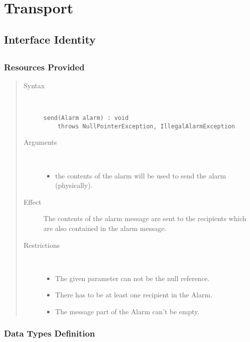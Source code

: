 \section{Transport}

\subsection{Interface Identity}

\subsection{}

\subsubsection{Resources Provided}

\begin{quote}
	\begin{description}
		\item[Syntax] \
		\begin{verbatim}
send(Alarm alarm) : void
    throws NullPointerException, IllegalAlarmException
		\end{verbatim}
		\item[Arguments] \
		\begin{itemize}
		  \item the contents of the alarm will be used to send the alarm (physically). 
		\end{itemize}
		\item[Effect] The contents of the alarm message are sent to the recipients
		which are also contained in the alarm message.
		\item[Restrictions] \
		\begin{itemize}
		  \item The given parameter can not be the null reference.
		  \item There has to be at least one recipient in the Alarm.
		  \item The message part of the Alarm can't be empty.
		\end{itemize}
	\end{description} 
\end{quote}

\subsubsection{Data Types Definition}

